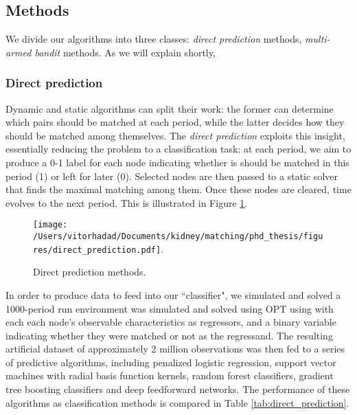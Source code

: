 \documentclass[12pt]{article}
\begin{document}
\subsection{Methods}

We divide our algorithms into three classes: \emph{direct prediction} methods, \emph{multi-armed bandit} methods. As we will explain shortly, 

\subsubsection{Direct prediction} \label{subsubsec:direct_prediction}

Dynamic and static algorithms can split their work: the former can determine which pairs should be matched at each period, while the latter decides how they should be matched among themselves. The \emph{direct prediction} exploits this insight, essentially reducing the problem to a classification task: at each period, we aim to produce a 0-1 label for each node indicating whether is should be matched in this period (1) or left for later (0). Selected nodes are then passed to a static solver that finds the maximal matching among them. Once these nodes are cleared, time evolves to the next period. This is illustrated in Figure \ref{fig:direct_prediction}.

\begin{figure}[H]
\centering
\hspace*{-1cm}
\texttt{[image: /Users/vitorhadad/Documents/kidney/matching/phd\_thesis/figures/direct\_prediction.pdf]}.
\caption{Direct prediction methods.}
\label{fig:direct_prediction}
\end{figure}

In order to produce data to feed into our ``classifier", we simulated and solved a 1000-period run environment was simulated and solved using OPT using with each each node's observable characteristics as regressors, and a binary variable indicating whether they were matched or not as the regressand. The resulting artificial dataset of approximately 2 million observations was then fed to a series of predictive algorithms, including penalized logistic regression\citep{wu2009genome}, support vector machines with radial basis function kernels\citep{cortes1995support}, random forest classifiers\citep{breiman2001random}, gradient tree boosting classifiers\citep{friedman2001greedy} and deep feedforward networks\citep{goodfellow2016deep}. The performance of these algorithms as classification methods is compared in Table \ref{tab:direct_prediction}.
\end{document}

